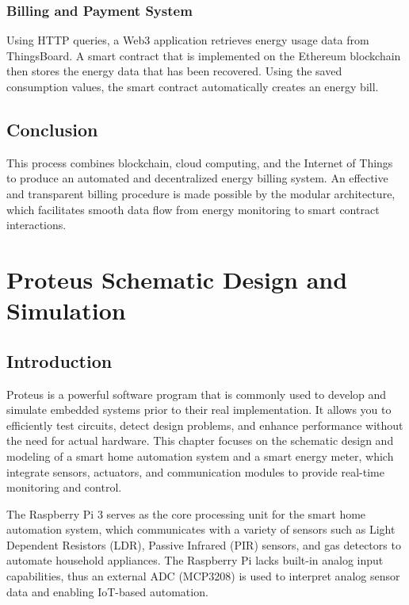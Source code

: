 \documentclass[a4paper,12pt]{report}
\begin{document}
\subsection{Billing and Payment System}

Using HTTP queries, a Web3 application retrieves energy usage data from ThingsBoard.  A smart contract that is implemented on the Ethereum blockchain then stores the energy data that has been recovered.  Using the saved consumption values, the smart contract automatically creates an energy bill.

\section{Conclusion}

This process combines blockchain, cloud computing, and the Internet of Things to produce an automated and decentralized energy billing system.  An effective and transparent billing procedure is made possible by the modular architecture, which facilitates smooth data flow from energy monitoring to smart contract interactions.


\chapter{Proteus Schematic Design and Simulation}

\section{Introduction}
Proteus is a powerful software program that is commonly used to develop and simulate embedded systems prior to their real implementation.  It allows you to efficiently test circuits, detect design problems, and enhance performance without the need for actual hardware.  This chapter focuses on the schematic design and modeling of a smart home automation system and a smart energy meter, which integrate sensors, actuators, and communication modules to provide real-time monitoring and control.


The Raspberry Pi 3 serves as the core processing unit for the smart home automation system, which communicates with a variety of sensors such as Light Dependent Resistors (LDR), Passive Infrared (PIR) sensors, and gas detectors to automate household appliances.  The Raspberry Pi lacks built-in analog input capabilities, thus an external ADC (MCP3208) is used to interpret analog sensor data and enabling IoT-based automation\cite{valov2020home}.
\end{document}
